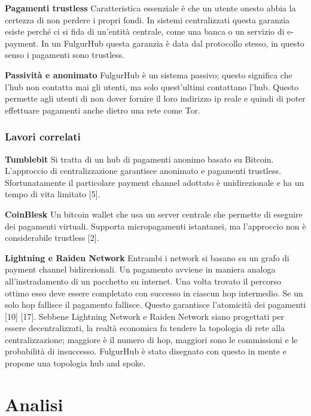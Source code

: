 \documentclass[12pt,italian,]{book}
\begin{document}
\textbf{\textbf{Pagamenti trustless}} Caratteristica essenziale è che un utente onesto abbia la certezza di non perdere i propri fondi. In sistemi centralizzati questa garanzia esiste perché ci si fida di un'entità centrale, come una banca o un servizio di e-payment. In un FulgurHub questa garanzia è data dal protocollo stesso, in questo senso i pagamenti sono trustless.

\textbf{\textbf{Passività e anonimato}} FulgurHub è un sistema passivo; questo significa che l'hub non contatta mai gli utenti, ma solo quest'ultimi contattano l'hub. Questo permette agli utenti di non dover fornire il loro indirizzo ip reale e quindi di poter effettuare pagamenti anche dietro una rete come Tor.

\hypertarget{lavori-correlati}{%
\subsection{Lavori correlati}\label{lavori-correlati}}

\textbf{\textbf{Tumblebit}} Si tratta di un hub di pagamenti anonimo basato su Bitcoin. L'approccio di centralizzazione garantisce anonimato e pagamenti trustless. Sfortunatamente il particolare payment channel adottato è unidirezionale e ha un tempo di vita limitato {[}5{]}.

\textbf{\textbf{CoinBlesk}} Un bitcoin wallet che usa un server centrale che permette di eseguire dei pagamenti virtuali. Supporta micropagamenti istantanei, ma l'approccio non è considerabile trustless {[}2{]}.

\textbf{\textbf{Lightning e Raiden Network}} Entrambi i network si basano su un grafo di payment channel bidirezionali. Un pagamento avviene in maniera analoga all'instradamento di un pacchetto su internet. Una volta trovato il percorso ottimo esso deve essere completato con successo in ciascun hop intermedio. Se un solo hop fallisce il pagamento fallisce. Questo garantisce l'atomicità dei pagamenti {[}10{]} {[}17{]}. Sebbene Lightning Network e Raiden Network siano progettati per essere decentralizzati, la realtà economica fa tendere la topologia di rete alla centralizzazione; maggiore è il numero di hop, maggiori sono le commissioni e le probabilità di insuccesso. FulgurHub è stato disegnato con questo in mente e propone una topologia hub and spoke.

\hypertarget{analisi}{%
\chapter{Analisi}\label{analisi}}
\end{document}
